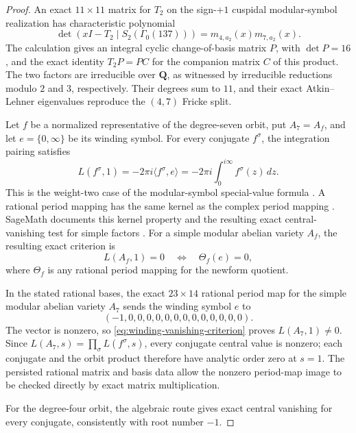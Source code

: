 \documentclass[11pt]{article}
\theoremstyle{definition}
\theoremstyle{remark}
\newcommand{\Q}{\mathbf{Q}}
\begin{document}
\begin{proof}
An exact $11\times11$ matrix for $T_2$ on the sign-$+1$
cuspidal modular-symbol realization has characteristic polynomial
\[
  \det(xI-T_2\mid S_2(\Gamma_0(137)))
  =m_{4,a_2}(x)m_{7,a_2}(x).
\]
The calculation gives an integral cyclic change-of-basis matrix $P$, with
$\det P=16$, and the exact identity $T_2P=PC$ for the companion matrix $C$ of
this product.  The two factors are irreducible over $\Q$, as witnessed by
irreducible reductions modulo $2$ and $3$, respectively.  Their degrees sum
to $11$, and their exact Atkin--Lehner eigenvalues reproduce the $(4,7)$
Fricke split.

Let $f$ be a normalized representative of the degree-seven orbit, put
$A_7=A_f$, and let $e=\{0,\infty\}$ be its winding symbol.  For every
conjugate $f^\sigma$, the integration pairing satisfies
\begin{equation}
  L(f^\sigma,1)=-2\pi i\langle f^\sigma,e\rangle
        =-2\pi i\int_0^{i\infty} f^\sigma(z)\,dz.
  \label{eq:winding-central-value}
\end{equation}
This is the weight-two case of the modular-symbol special-value formula
\cite[Equation~(8.5.5)]{Stein2007}.  A rational period mapping has the same
kernel as the complex period mapping
\cite[Section~10.6]{Stein2007}.  SageMath documents this kernel property and
the resulting exact central-vanishing test for simple factors
\cite{SageModularSymbolsPeriods,SageAbvarLseries}.
For a simple modular abelian variety $A_f$, the resulting exact criterion is
\begin{equation}
  L(A_f,1)=0
  \quad\Longleftrightarrow\quad
  \Theta_f(e)=0,
  \label{eq:winding-vanishing-criterion}
\end{equation}
where $\Theta_f$ is any rational period mapping for the newform quotient.

In the stated rational bases, the exact $23\times14$ rational period map for
the simple modular abelian variety $A_7$ sends the winding symbol $e$ to
\[
  (-1,0,0,0,0,0,0,0,0,0,0,0,0,0).
\]
The vector is nonzero, so
\eqref{eq:winding-vanishing-criterion} proves $L(A_7,1)\neq0$.  Since
$L(A_7,s)=\prod_\sigma L(f^\sigma,s)$, every conjugate central value is
nonzero; each conjugate and the orbit product therefore have analytic order
zero at $s=1$.  The persisted rational matrix and basis data allow the
nonzero period-map image to be checked directly by exact matrix
multiplication.

For the degree-four orbit, the algebraic route gives exact central vanishing
for every conjugate, consistently with root number $-1$.
\end{proof}
\end{document}
